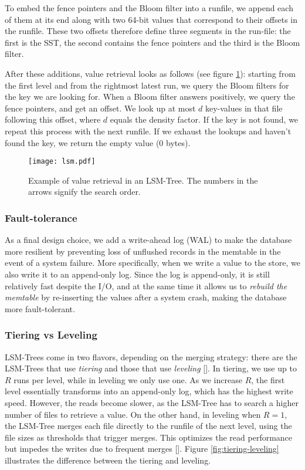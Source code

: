 To embed the fence pointers and the Bloom filter into a runfile, we append each of them at its end along with two 64-bit values that correspond to their offsets in the runfile. These two offsets therefore define three segments in the run-file: the first is the SST, the second contains the fence pointers and the third is the Bloom filter.

After these additions, value retrieval looks as follows (see figure \ref{fig:lsm}): starting from the first level and from the rightmost latest run, we query the Bloom filters for the key we are looking for. When a Bloom filter answers positively, we query the fence pointers, and get an offset. We look up at most $d$ key-values in that file following this offset, where $d$ equals the density factor. If the key is not found, we repeat this process with the next runfile. If we exhaust the lookups and haven't found the key, we return the empty value (0 bytes).

\begin{figure}[h]
    \centering
    \texttt{[image: lsm.pdf]}
    \caption{Example of value retrieval in an LSM-Tree. The numbers in the arrows signify the search order.}
    \label{fig:lsm}
\end{figure}

\subsubsection{Fault-tolerance}

As a final design choice, we add a write-ahead log (WAL) to make the database more resilient by preventing loss of unflushed records in the memtable in the event of a system failure.
More specifically, when we write a value to the store, we also write it to an append-only log. Since the log is append-only, it is still relatively fast despite the I/O, and at the same time it allows us to \textit{rebuild the memtable} by re-inserting the values after a system crash, making the database more fault-tolerant. 

\subsubsection{Tiering vs Leveling}

LSM-Trees come in two flavors, depending on the merging strategy: there are the LSM-Trees that use \textit{tiering} and those that use \textit{leveling} [\cite{compactionary}]. In tiering, we use up to $R$ runs per level, while in leveling we only use one.
As we increase $R$, the first level essentially transforms into an append-only log, which has the highest write speed. However, the reads become slower, as the LSM-Tree has to search a higher number of files to retrieve a value. On the other hand, in leveling when $R=1$, the LSM-Tree merges each file directly to the runfile of the next level, using the file sizes as thresholds that trigger merges. This optimizes the read performance but impedes the writes due to frequent merges [\cite{lsm-design-space}]. Figure \ref{fig:tiering-leveling} illustrates the difference between the tiering and leveling.

